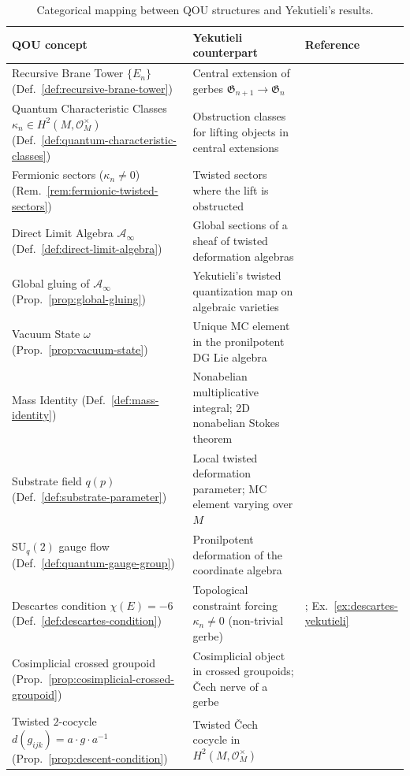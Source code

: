 \begin{table}[ht]
\centering
\small
\begin{tabular}{p{4.2cm}p{4.8cm}p{4.5cm}}
\hline
\textbf{QOU concept} & \textbf{Yekutieli counterpart} & \textbf{Reference} \\
\hline
Recursive Brane Tower $\{E_n\}$
  (Def.~\ref{def:recursive-brane-tower})
  & Central extension of gerbes
    $\mathfrak{G}_{n+1} \to \mathfrak{G}_n$
  & \cite[Thm.~1.7]{yekutieli2010} \\[6pt]
Quantum Characteristic Classes $\kappa_n \in H^2(M, \mathcal{O}_M^{\times})$
  (Def.~\ref{def:quantum-characteristic-classes})
  & Obstruction classes for lifting objects in central extensions
  & \cite[\S3]{yekutieli2010} \\[6pt]
Fermionic sectors ($\kappa_n \neq 0$)
  (Rem.~\ref{rem:fermionic-twisted-sectors})
  & Twisted sectors where the lift is obstructed
  & \cite[Thm.~3.4]{yekutieli2010} \\[6pt]
Direct Limit Algebra $\mathcal{A}_\infty$
  (Def.~\ref{def:direct-limit-algebra})
  & Global sections of a sheaf of twisted deformation algebras
  & \cite{yekutieli2008} \\[6pt]
Global gluing of $\mathcal{A}_\infty$
  (Prop.~\ref{prop:global-gluing})
  & Yekutieli's twisted quantization map on algebraic varieties
  & \cite[Thm.~4.5]{yekutieli2010} \\[6pt]
Vacuum State $\omega$
  (Prop.~\ref{prop:vacuum-state})
  & Unique MC element in the pronilpotent DG Lie algebra
  & \cite{yekutieli2009} \\[6pt]
Mass Identity (Def.~\ref{def:mass-identity})
  & Nonabelian multiplicative integral; 2D nonabelian Stokes theorem
  & \cite[Ch.~5--6]{yekutieli2015} \\[6pt]
Substrate field $q(p)$
  (Def.~\ref{def:substrate-parameter})
  & Local twisted deformation parameter; MC element varying over $M$
  & \cite{yekutieli2008, yekutieli2009} \\[6pt]
$\mathrm{SU}_q(2)$ gauge flow
  (Def.~\ref{def:quantum-gauge-group})
  & Pronilpotent deformation of the coordinate algebra
  & \cite[\S2]{yekutieli2008} \\[6pt]
Descartes condition $\chi(E) = -6$
  (Def.~\ref{def:descartes-condition})
  & Topological constraint forcing $\kappa_n \neq 0$ (non-trivial gerbe)
  & \cite{yekutieli2010}; Ex.~\ref{ex:descartes-yekutieli} \\[6pt]
Cosimplicial crossed groupoid
  (Prop.~\ref{prop:cosimplicial-crossed-groupoid})
  & Cosimplicial object in crossed groupoids; \v{C}ech nerve of a gerbe
  & \cite[\S1--2]{yekutieli2010} \\[6pt]
Twisted $2$-cocycle $d(g_{ijk}) = a \cdot g \cdot a^{-1}$
  (Prop.~\ref{prop:descent-condition})
  & Twisted \v{C}ech cocycle in $H^2(M, \mathcal{O}_M^\times)$
  & \cite[Thm.~1.7]{yekutieli2010} \\
\hline
\end{tabular}
\caption{Categorical mapping between QOU structures and Yekutieli's results.}
\label{tab:yekutieli-mapping}
\end{table}

